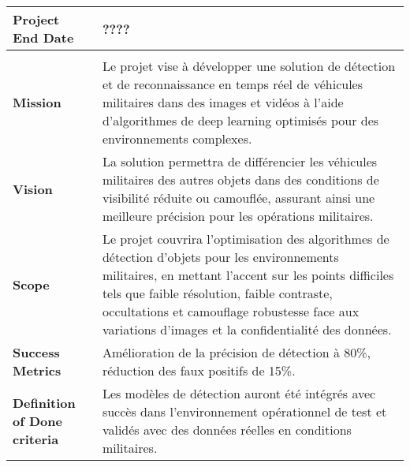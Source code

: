 \begin{table}[h]
\begin{tabular}{|p{4cm}|p{12.5cm}|}
        \hline
        \textbf{Project End Date}                    & ????                                                                                                                                                                                                                                                                                                          \\
        \hline
        \rowcolor{gray}\multicolumn{2}{|c|}{\textbf{Project Details}}                                                                                                                                                                                                                                                                                                \\
        \hline
        \textbf{Mission}                             & Le projet vise à développer une solution de détection et de reconnaissance en temps réel de véhicules militaires dans des images et vidéos à l'aide d'algorithmes de deep learning optimisés pour des environnements complexes.                                                                               \\
        \hline
        \textbf{Vision}                              & La solution permettra de différencier les véhicules militaires des autres objets dans des conditions de visibilité réduite ou camouflée, assurant ainsi une meilleure précision pour les opérations militaires.                                                                                               \\
        \hline
        \textbf{Scope}                               & Le projet couvrira l'optimisation des algorithmes de détection d'objets pour les environnements militaires, en mettant l'accent sur les points difficiles tels que faible résolution, faible contraste, occultations et camouflage robustesse face aux variations d'images et la confidentialité des données. \\
        \hline
        \textbf{Success Metrics}                     & Amélioration de la précision de détection à 80\%, réduction des faux positifs de 15\%.                                                                                                                                                                                                                        \\
        \hline
        \textbf{Definition of Done criteria}         & Les modèles de détection auront été intégrés avec succès dans l'environnement opérationnel de test et validés avec des données réelles en conditions militaires.                                                                                                                                              \\

\end{tabular}
\end{table}
